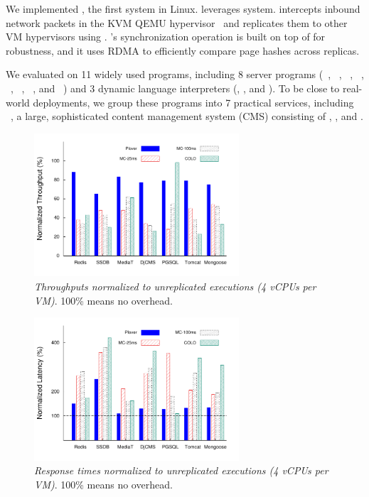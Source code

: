 We implemented \yyy, the first \vsmr system in Linux. \yyy leverages \xxx 
\paxos system. \yyy intercepts inbound network packets in the KVM QEMU 
hypervisor~\cite{qemu} and replicates them to other VM hypervisors using \paxos. 
\yyy's synchronization operation is built on top of \paxos for robustness, and 
it uses RDMA to efficiently compare page hashes across replicas.

We evaluated \yyy on 11 widely used programs, including 8 server programs 
(\redis~\cite{redis}, \ssdb~\cite{ssdb}, \mediatomb~\cite{mediatomb}, 
\nginx~\cite{nginx}, \mysql~\cite{mysql}, \tomcat~\cite{tomcat}, 
\pgsql~\cite{pgsql}, and \mongoose~\cite{mongoose}) and 3 dynamic 
language interpreters (\php, \python, and \jsp). To be close to real-world 
deployments, we group these programs into 7 practical services, 
including \cms~\cite{django:cms}, a large, sophisticated content management 
system (CMS) consisting of \nginx, \python, and \mysql.

\begin{figure}[htbp]
\centering
\includegraphics[width=3in]{figures/FIG1__throughput-overhead}
\caption{{\em Throughputs normalized to unreplicated executions (4 vCPUs per 
VM)}. 100\% means no overhead.}
\label{fig:vmtput}
\end{figure}

\begin{figure}[htbp]
\centering
\includegraphics[width=3in]{figures/FIG9_latency-overhead}
\caption{{\em Response times normalized to unreplicated 
executions (4 vCPUs per VM)}. 100\% means no overhead.}
\label{fig:latency}
\end{figure}


